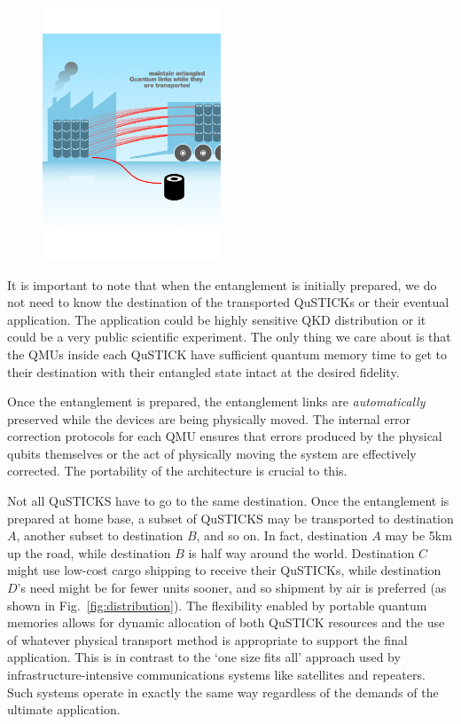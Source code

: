 \documentclass[twocolumn, aps, rmp, amsmath, amssymb, nofootinbib, superscriptaddress, longbibliography, floatfix, table-of-contents, eqsecnum]{revtex4-2}
\begin{document}
\begin{figure}[htbp!]
	\includegraphics[clip=true, width=0.475\textwidth]{qustick2}
	\caption{} \label{fig:loading}
\end{figure}

It is important to note that when the entanglement is initially prepared, we do not need to know the destination of the transported QuSTICKs or their eventual application. The application could be highly sensitive QKD distribution or it could be a very public scientific experiment. The only thing we care about is that the QMUs inside each QuSTICK have sufficient quantum memory time to get to their destination with their entangled state intact at the desired fidelity.

Once the entanglement is prepared, the entanglement links are \textit{automatically} preserved while the devices are being physically moved. The internal error correction protocols for each QMU ensures that errors produced by the physical qubits themselves or the act of physically moving the system are effectively corrected. The portability of the architecture is crucial to this. 

Not all QuSTICKS have to go to the same destination. Once the entanglement is prepared at home base, a subset of QuSTICKS may be transported to destination $A$, another subset to destination $B$, and so on. In fact, destination $A$ may be 5km up the road, while destination $B$ is half way around the world. Destination $C$ might use low-cost cargo shipping to receive their QuSTICKs, while destination $D$'s need might be for fewer units sooner, and so shipment by air is preferred (as shown in Fig.~\ref{fig:distribution}). The flexibility enabled by portable quantum memories allows for dynamic allocation of both QuSTICK resources and the use of whatever physical transport method is appropriate to support the final application. This is in contrast to the `one size fits all' approach used by infrastructure-intensive communications systems like satellites and repeaters. Such systems operate in exactly the same way regardless of the demands of the ultimate application.
\end{document}
